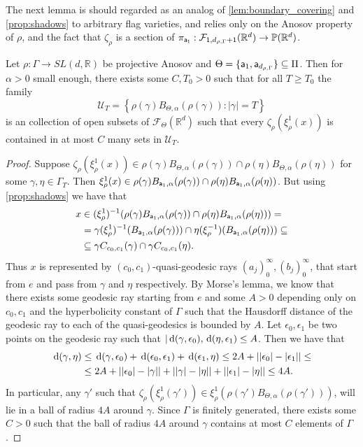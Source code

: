 \documentclass{report}
\begin{document}
The next lemma is should regarded as an analog of \cref{lem:boundary_covering} and \cref{prop:shadows} to arbitrary flag varieties, and relies only on the Anosov property of $\rho$, and the fact that $\zeta_\rho$ is a section of $\pi_{\sf a_1}: \mathcal F_{1, d_{\rho,\Gamma}+1}(\mathbb R^d) \to \mathbb P(\mathbb R^d)$.
\begin{lemma}\label{lem:boundary_covering_higher}
Let $\rho: \Gamma \to SL(d, \mathbb R)$ be projective Anosov and $\Theta = \{ {\sf a}_1, {\sf a}_{d_{\rho, \Gamma}}\} \subseteq \Pi$.
Then for $\alpha > 0$ small enough, there exists some $C, T_0 > 0$ such that for all $T \geq T_0$ the family
\[
    \mathcal U_T = \left\{ \rho(\gamma) B_{\Theta, \alpha}(\rho(\gamma)) : |\gamma| = T \right\}
\]
is an collection of open subsets of $\mathcal F_\Theta(\mathbb R^d)$ such that every $\zeta_\rho(\xi^1_\rho(x))$ is contained in at most $C$ many sets in $\mathcal U_T$.
\end{lemma}
\begin{proof}
Suppose $\zeta_\rho(\xi^1_\rho(x)) \in \rho(\gamma) B_{\Theta, \alpha}(\rho(\gamma)) \cap \rho(\eta) B_{\Theta, \alpha}(\rho(\eta))$ for some $\gamma, \eta \in \Gamma_T$.
Then $\xi_\rho^1(x) \in \rho(\gamma) B_{{\sf a}_1, \alpha}(\rho(\gamma)) \cap \rho(\eta) B_{{\sf a}_1, \alpha}(\rho(\eta))$.
But using \cref{prop:shadows} we have that
\begin{align*}
    x &\in (\xi_\rho^1)^{-1}(\rho(\gamma) B_{{\sf a}_1, \alpha}(\rho(\gamma)) \cap \rho(\eta) B_{{\sf a}_1, \alpha}(\rho(\eta))) =\\
    &= \gamma(\xi_\rho^1)^{-1}(B_{{\sf a}_1, \alpha}(\rho(\gamma))) \cap \eta (\xi_\rho^{-1})(B_{{\sf a}_1, \alpha}(\rho(\eta))) \subseteq\\
    &\subseteq \gamma C_{c_0, c_1}(\gamma) \cap \gamma C_{c_0, c_1}(\eta).
\end{align*}
Thus $x$ is represented by $(c_0, c_1)$-quasi-geodesic rays $(a_j)_0^\infty, (b_j)_0^\infty $, that start from $e$ and pass from $\gamma$ and $\eta$ respectively.
By Morse's lemma, we know that there exists some geodesic ray starting from $e$ and some $A > 0$ depending only on $c_0, c_1$ and the hyperbolicity constant of $\Gamma$ such that the Hausdorff distance of the geodesic ray to each of the quasi-geodesics is bounded by $A$. 
Let $\epsilon_0, \epsilon_1$ be two points on the geodesic ray such that $|\,\mathrm{d}(\gamma, \epsilon_0), \,\mathrm{d}(\eta, \epsilon_1) \leq A$.
Then we have that
\begin{align*}
    \,\mathrm{d}(\gamma, \eta) &\leq \,\mathrm{d}(\gamma, \epsilon_0) + \,\mathrm{d}(\epsilon_0, \epsilon_1) + \,\mathrm{d}(\epsilon_1, \eta) \leq 
    2A + | |\epsilon_0| - |\epsilon_1|| \leq\\
    &\leq
    2A + | |\epsilon_0| - |\gamma|| + | |\gamma| - |\eta| | + | |\epsilon_1| - |\eta|| \leq 4A.
\end{align*}
In particular, any $\gamma'$ such that $\zeta_\rho(\xi^1_\rho(\gamma'))  \in \xi_\rho^1(\rho(\gamma') B_{\Theta, \alpha}(\rho(\gamma')))$, will lie in a ball of radius $4A$ around $\gamma$.
Since $\Gamma$ is finitely generated, there exists some $C > 0$ such that the ball of radius $4A$ around $\gamma$ contains at most $C$ elements of $\Gamma$.
\end{proof}
\end{document}
